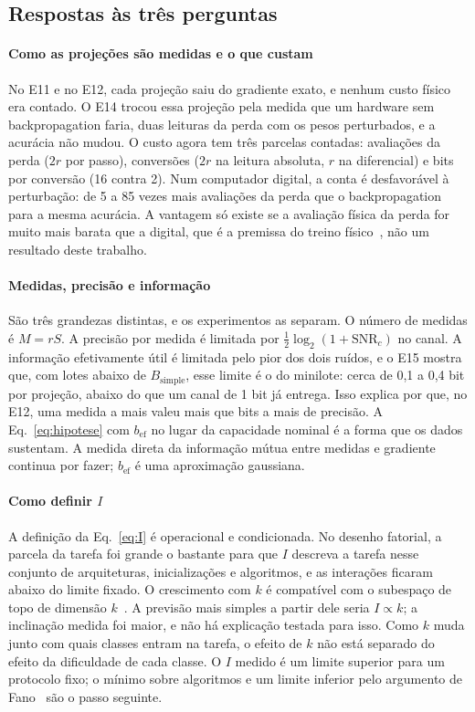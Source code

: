 \documentclass[journal]{IEEEtran}
\newcommand{\SNR}{\mathrm{SNR}}
\begin{document}
\subsection{Respostas às três perguntas}

\paragraph*{Como as projeções são medidas e o que custam} No E11 e no E12, cada projeção saiu do gradiente exato, e nenhum custo físico era contado. O E14 trocou essa projeção pela medida que um hardware sem backpropagation faria, duas leituras da perda com os pesos perturbados, e a acurácia não mudou. O custo agora tem três parcelas contadas: avaliações da perda ($2r$ por passo), conversões ($2r$ na leitura absoluta, $r$ na diferencial) e bits por conversão (16 contra 2). Num computador digital, a conta é desfavorável à perturbação: de 5 a 85 vezes mais avaliações da perda que o backpropagation para a mesma acurácia. A vantagem só existe se a avaliação física da perda for muito mais barata que a digital, que é a premissa do treino físico~\cite{tkachenko2025}, não um resultado deste trabalho.

\paragraph*{Medidas, precisão e informação} São três grandezas distintas, e os experimentos as separam. O número de medidas é $M = rS$. A precisão por medida é limitada por $\tfrac12\log_2(1+\SNR_c)$ no canal. A informação efetivamente útil é limitada pelo pior dos dois ruídos, e o E15 mostra que, com lotes abaixo de $B_{\text{simple}}$, esse limite é o do minilote: cerca de 0,1 a 0,4 bit por projeção, abaixo do que um canal de 1 bit já entrega. Isso explica por que, no E12, uma medida a mais valeu mais que bits a mais de precisão. A Eq.~\eqref{eq:hipotese} com $b_{\text{ef}}$ no lugar da capacidade nominal é a forma que os dados sustentam. A medida direta da informação mútua entre medidas e gradiente continua por fazer; $b_{\text{ef}}$ é uma aproximação gaussiana.

\paragraph*{Como definir $I$} A definição da Eq.~\eqref{eq:I} é operacional e condicionada. No desenho fatorial, a parcela da tarefa foi grande o bastante para que $I$ descreva a tarefa nesse conjunto de arquiteturas, inicializações e algoritmos, e as interações ficaram abaixo do limite fixado. O crescimento com $k$ é compatível com o subespaço de topo de dimensão $k$~\cite{gurari2018,papyan2020}. A previsão mais simples a partir dele seria $I \propto k$; a inclinação medida foi maior, e não há explicação testada para isso. Como $k$ muda junto com quais classes entram na tarefa, o efeito de $k$ não está separado do efeito da dificuldade de cada classe. O $I$ medido é um limite superior para um protocolo fixo; o mínimo sobre algoritmos e um limite inferior pelo argumento de Fano~\cite{agarwal2012} são o passo seguinte.
\end{document}
